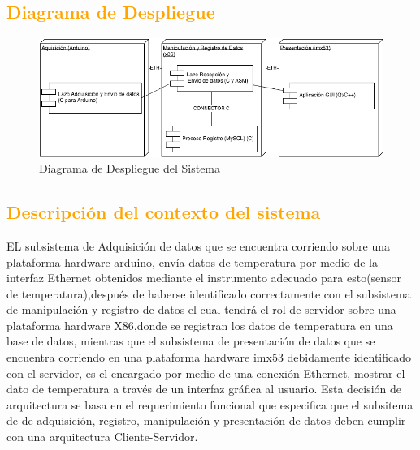 \subsection{\textcolor{orange}{Diagrama de Despliegue}}
\begin{figure}[h!]
 \begin{center}
  \includegraphics[width=1\textwidth,keepaspectratio=true]{img/Deployement.png}
  \caption{Diagrama de Despliegue del Sistema}
  \label{fig:esquema}
 \end{center}
\end{figure}

\subsection{\textcolor{orange}{Descripción del contexto del sistema}}

EL subsistema de Adquisición  de datos que se encuentra corriendo sobre una plataforma hardware arduino, envía datos de temperatura por medio de la interfaz Ethernet obtenidos mediante el instrumento adecuado para esto(sensor de temperatura),después de haberse identificado correctamente con el subsistema de manipulación y registro de datos el cual tendrá el rol de servidor sobre una plataforma hardware X86,donde se registran los datos de temperatura en una base de datos, mientras que el subsistema de presentación de datos que se encuentra corriendo en una plataforma hardware imx53 debidamente identificado con el servidor, es el encargado por medio de una conexión Ethernet, mostrar el dato de temperatura a través de un interfaz gráfica al usuario. 
Esta decisión de arquitectura se basa en el requerimiento funcional que especifica que el subsitema de de adquisición, registro, manipulación y presentación de datos  deben cumplir con una arquitectura Cliente-Servidor. 

\newpage

